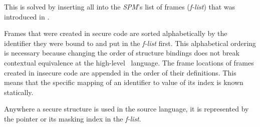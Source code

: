 This is solved by inserting all  into the \emph{SPM}'s list of frames (\emph{f-list}) that was introduced in . 

Frames that were created in secure code are sorted alphabetically by the identifier they were bound to and put in the \emph{f-list} first.
This alphabetical ordering is necessary because changing the order of structure bindings does not break contextual equivalence at the high-level \MiniML\ language.
The frame locations of frames created in insecure code are appended in the order of their definitions.
This means that the specific mapping of an identifier to value of its index is known statically.

Anywhere a secure structure is used in the source language, it is represented by the  pointer or its masking index in the \emph{f-list}.

